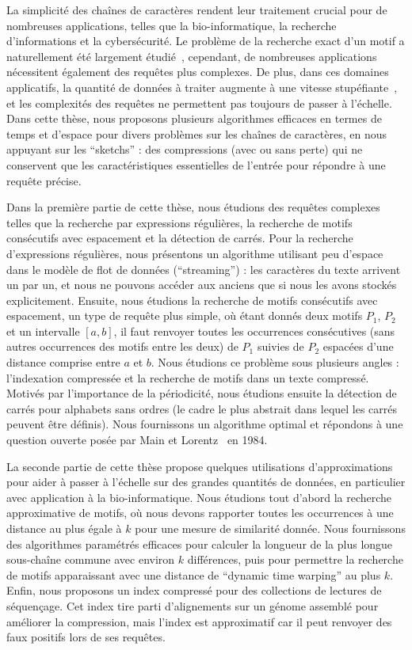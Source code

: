 La simplicité des chaînes de caractères rendent leur traitement crucial pour de nombreuses applications, telles que la bio-informatique, la recherche d'informations et la cybersécurité.
Le problème de la recherche exact d'un motif a naturellement été largement étudié~\cite{Charras2004}, cependant, de nombreuses applications nécessitent également des requêtes plus complexes. De plus, dans ces domaines applicatifs, la quantité de données à traiter augmente à une vitesse stupéfiante~\cite{muir2016real}, et les complexités des requêtes ne permettent pas toujours de passer à l'échelle.
Dans cette thèse, nous proposons plusieurs algorithmes efficaces en termes de temps et d'espace pour divers problèmes sur les chaînes de caractères, en nous appuyant sur les ``sketchs'' : des compressions (avec ou sans perte) qui ne conservent que les caractéristiques essentielles de l'entrée pour répondre à une requête précise.

Dans la première partie de cette thèse, nous étudions des requêtes complexes telles que la recherche par expressions régulières, la recherche de motifs consécutifs avec espacement et la détection de carrés.
Pour la recherche d'expressions régulières, nous présentons un algorithme utilisant peu d'espace dans le modèle de flot de données (``streaming'') : les caractères du texte arrivent un par un, et nous ne pouvons accéder aux anciens que si nous les avons stockés explicitement.
Ensuite, nous étudions la recherche de motifs consécutifs avec espacement, un type de requête plus simple, où étant donnés deux motifs $P_1$, $P_2$ et un intervalle $[a, b]$, il faut renvoyer toutes les occurrences consécutives (sans autres occurrences des motifs entre les deux) de $P_1$ suivies  de $P_2$ espacées d'une distance comprise entre $a$ et $b$. Nous étudions ce problème sous plusieurs angles : l'indexation compressée et la recherche de motifs dans un texte compressé.
Motivés par l'importance de la périodicité, nous étudions ensuite la détection de carrés pour alphabets sans ordres (le cadre le plus abstrait dans lequel les carrés peuvent être définis). Nous fournissons un algorithme optimal et répondons à une question ouverte posée par Main et Lorentz~\cite{Main1984} en 1984.

La seconde partie de cette thèse propose quelques utilisations d'approximations pour aider à passer à l'échelle sur des grandes quantités de données, en particulier avec application à la bio-informatique.
%
Nous étudions tout d'abord la recherche approximative de motifs, où nous devons rapporter toutes les occurrences à une distance au plus égale à $k$ pour une mesure de similarité donnée.
Nous fournissons des algorithmes paramétrés efficaces pour calculer la longueur de la plus longue sous-chaîne commune avec environ $k$ différences, puis pour permettre la recherche de motifs apparaissant avec une distance de ``dynamic time warping'' au plus $k$.
Enfin, nous proposons un index compressé pour des collections de lectures de séquençage. Cet index tire parti d'alignements sur un génome assemblé pour améliorer la compression, mais l'index est approximatif car il peut renvoyer des faux positifs lors de ses requêtes.